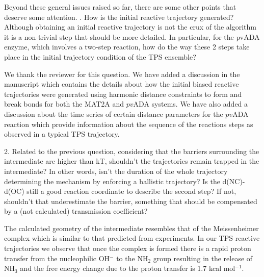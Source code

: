 \documentclass[journal=jpcbfk,manuscript=article,layout=traditional]{achemso}
\begin{document}
{\begin{response}{Beyond these general issues raised so far, there are some other points 
that deserve some attention.
. How is the initial reactive trajectory generated? Although obtaining an initial reactive 
trajectory is not the crux of the algorithm it is a non-trivial step that should be more 
detailed. In particular, for the pvADA enzyme, which involves a two-step reaction, how 
do the way these 2 steps take place in the initial trajectory condition of the TPS ensemble?}

We thank the reviewer for this question. We have added a discussion in the manuscript
which contains the details about how the initial biased reactive trajectories were
generated using harmonic distance constraints to form and break bonds for both the 
MAT2A and $pv$ADA systems. We have also added a discussion about the 
time series of certain distance parameters for the $pv$ADA reaction which provide 
information about the sequence of the reactions steps as observed in a typical 
TPS trajectory.    

\end{response}

\begin{response}{2. Related to the previous question, considering that the barriers 
surrounding the intermediate are higher than kT, shouldn't the trajectories remain 
trapped in the intermediate? In other words, isn't the duration of the whole trajectory 
determining the mechanism by enforcing a ballistic trajectory? Is the d(NC)-d(OC) still 
a good reaction coordinate to describe the second step? If not, shouldn't that underestimate 
the barrier, something that should be compensated by a (not calculated) transmission coefficient?}

The calculated geometry of the intermediate resembles that of the Meissenheimer complex 
which is similar to that predicted from experiments. In our TPS reactive trajectories we 
observe that once the complex is formed there is a rapid proton transfer from the 
nucleophilic OH$^{-}$ to the NH$_2$ group resulting in the release of NH$_3$ and the free 
energy change due to the proton transfer is 1.7 kcal mol$^{-1}$. 
   

\end{response}}
\end{document}
